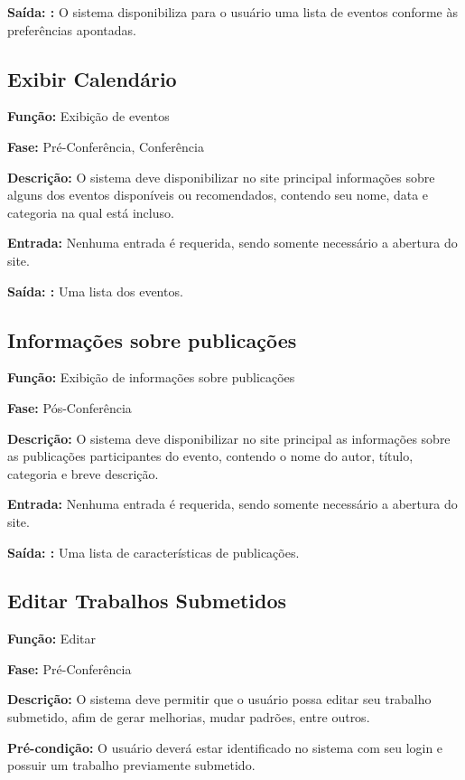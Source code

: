 \documentclass[letter]{article}
\begin{document}
\textbf{Saída: :} O sistema disponibiliza para o usuário uma lista de eventos conforme às preferências apontadas.



\subsection{ Exibir Calendário}

\textbf{Função:} Exibição de eventos

\textbf{Fase: } Pré-Conferência, Conferência

\textbf{Descrição: } O sistema deve disponibilizar no site principal informações sobre alguns dos eventos disponíveis ou recomendados, contendo seu 
nome, data e categoria na qual está incluso.

\textbf{Entrada: } Nenhuma entrada é requerida, sendo somente necessário a
abertura do site.

\textbf{Saída: :} Uma lista dos eventos.



\subsection{Informações sobre publicações}

\textbf{Função:} Exibição de informações sobre publicações

\textbf{Fase: } Pós-Conferência

\textbf{Descrição: } O sistema deve disponibilizar no site principal as informações sobre as publicações participantes do evento, contendo o nome do autor, título, categoria e breve descrição.

\textbf{Entrada: } Nenhuma entrada é requerida, sendo somente necessário a
abertura do site.

\textbf{Saída: :} Uma lista de características de publicações.



\subsection{Editar Trabalhos Submetidos}

\textbf{Função:}  Editar

\textbf{Fase:} Pré-Conferência

\textbf{Descrição:} O sistema deve permitir que o usuário possa editar seu trabalho submetido, afim de gerar melhorias, mudar padrões, entre outros.

\textbf{Pré-condição:}  O usuário deverá estar identificado no sistema com seu login e possuir um trabalho previamente submetido.
\end{document}
